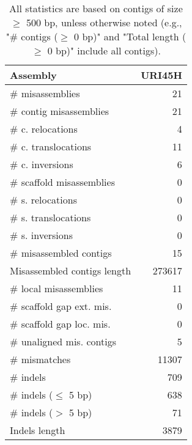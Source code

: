 \documentclass[12pt,a4paper]{article}
\begin{document}
\begin{table}[ht]
\begin{center}
\caption{All statistics are based on contigs of size $\geq$ 500 bp, unless otherwise noted (e.g., "\# contigs ($\geq$ 0 bp)" and "Total length ($\geq$ 0 bp)" include all contigs).}
\begin{tabular}{|l*{1}{|r}|}
\hline
Assembly & URI45H \\ \hline
\# misassemblies & 21 \\ \hline
\hspace{2mm}\# contig misassemblies & 21 \\ \hline
\hspace{5mm}\# c. relocations & 4 \\ \hline
\hspace{5mm}\# c. translocations & 11 \\ \hline
\hspace{5mm}\# c. inversions & 6 \\ \hline
\hspace{2mm}\# scaffold misassemblies & 0 \\ \hline
\hspace{5mm}\# s. relocations & 0 \\ \hline
\hspace{5mm}\# s. translocations & 0 \\ \hline
\hspace{5mm}\# s. inversions & 0 \\ \hline
\# misassembled contigs & 15 \\ \hline
Misassembled contigs length & 273617 \\ \hline
\# local misassemblies & 11 \\ \hline
\# scaffold gap ext. mis. & 0 \\ \hline
\# scaffold gap loc. mis. & 0 \\ \hline
\# unaligned mis. contigs & 5 \\ \hline
\# mismatches & 11307 \\ \hline
\# indels & 709 \\ \hline
\hspace{5mm}\# indels ($\leq$ 5 bp) & 638 \\ \hline
\hspace{5mm}\# indels ($>$ 5 bp) & 71 \\ \hline
Indels length & 3879 \\ \hline
\end{tabular}
\end{center}
\end{table}
\end{document}
